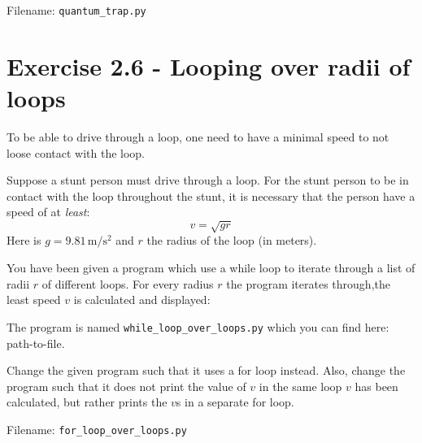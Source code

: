 \documentclass[10pt,a4paper]{article}
\begin{document}
Filename: \texttt{quantum\_trap.py}


\newpage 
\section*{Exercise 2.6 - Looping over radii of loops}
To be able to drive through a loop, one need to have a minimal speed to not loose contact with the loop. 

Suppose a stunt person must drive through a loop. For the stunt person to be in contact with the loop throughout the stunt, it is necessary that the person have a speed of at \textit{least}: 
\[
v = \sqrt{gr}
\]
 Here is $g = 9.81\,\mathrm{m/s^2}$ and $r$ the radius of the loop (in meters).

You have been given a program which use a while loop to iterate through a list of radii $r$ of different loops. For every radius $r$ the program iterates through,the least speed $v$ is calculated and displayed: 

The program is named \texttt{while\_loop\_over\_loops.py} which you can find here: path-to-file. 

Change the given program such that it uses a for loop instead. Also, change the program such that it does not print the value of $v$ in the same loop $v$ has been calculated, but rather prints the $v$s in a separate for loop.  

Filename: \texttt{for\_loop\_over\_loops.py}
\end{document}
